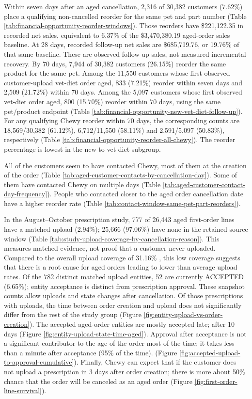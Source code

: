 \documentclass[
  10pt,
]{article}
\newcounter{none} %
\begin{document}
Within seven days after an aged cancellation, 2,316 of 30,382 customers
(7.62\%) place a qualifying non-cancelled reorder for the same pet and
part number (Table \ref{tab:financial-opportunity-reorder-windows}).
Those reorders have \$221,122.35 in recorded net sales, equivalent to
6.37\% of the \$3,470,380.19 aged-order sales baseline. At 28 days,
recorded follow-up net sales are \$685,719.76, or 19.76\% of that same
baseline. These are observed follow-up sales, not measured incremental
recovery. By 70 days, 7,944 of 30,382 customers (26.15\%) reorder the
same product for the same pet.
Among the 11,550 customers whose first observed customer-upload vet-diet
order aged, 833 (7.21\%) reorder within seven days and 2,509 (21.72\%)
within 70 days. Among the 5,097 customers whose first observed vet-diet
order aged, 800 (15.70\%) reorder within 70 days, using the same pet/product
endpoint (Table \ref{tab:financial-opportunity-new-vet-diet-follow-up}).
For any qualifying Chewy reorder within 70 days, the corresponding
counts are 18,569/30,382 (61.12\%), 6,712/11,550 (58.11\%) and
2,591/5,097 (50.83\%), respectively
(Table \ref{tab:financial-opportunity-reorder-all-chewy}).
The reorder percentage is lowest in the new to vet diet subgroup.


All of the customers seem to have contacted Chewy, most of them at the
creation of the order (Table
\ref{tab:aged-customer-contacts-by-cancellation-day}). Some of them
have contacted Chewy on multiple days (Table
\ref{tab:aged-customer-contact-day-frequency}). People who
contacted closer to the aged order cancellation date have a higher
reorder rate (Table \ref{tab:contact-window-same-pet-part-reorders}).

In the August--October prescription study, 777 of 26,443 aged
first-order lines have a matched upload (2.94\%); 25,666 (97.06\%)
have none in the retained source window (Table
\ref{tab:study-upload-coverage-by-cancellation-reason}).  This
measures matched evidence, not proof that a customer never uploaded.
Compared to the overall upload coverage of 31.16\% , this low coverage
suggests that there is a root cause for aged orders leading to lower
than average upload rates.  Of the 782 distinct matched upload
entities, 52 are currently ACCEPTED (6.65\%); entity acceptance is
distinct from prescription approval.  These snapshot counts allow
uploads and state changes after cancellation.  Of those prescriptions
with uploads, the time between order creation and upload does not
significantly differ from the rest of the study group (Figure
\ref{fig:entity-upload-vs-order-creation}). The accepted aged-order
entities are mostly accepted late; after 10 days (Figure
\ref{fig:entity-upload-state-time-aged}). Approval after acceptance is
not a significant contributor to the age of the order most of the
time; it takes less than a minute after acceptance (95\% of the
time). (Figure
\ref{fig:accepted-upload-to-approval-cumulative}). Finally, Chewy can
expect that if the customer does not upload a prescription in 3 days
after order creation; there is more about 50\% chance that the order
will be canceled as an aged order (Figure
\ref{fig:first-order-line-survival}).
\end{document}
